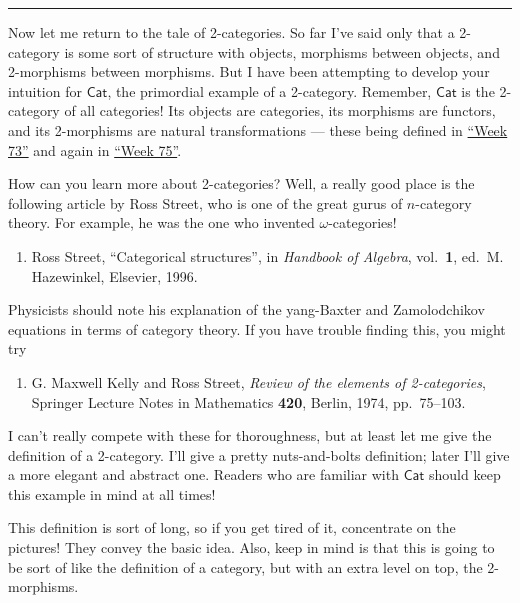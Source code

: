 \documentclass{article}
\def\tightlist{}
\begin{document}
\begin{center}\rule{0.5\linewidth}{0.5pt}\end{center}

Now let me return to the tale of 2-categories. So far I've said only
that a 2-category is some sort of structure with objects, morphisms
between objects, and 2-morphisms between morphisms. But I have been
attempting to develop your intuition for \(\mathsf{Cat}\), the
primordial example of a 2-category. Remember, \(\mathsf{Cat}\) is the
2-category of all categories! Its objects are categories, its morphisms
are functors, and its 2-morphisms are natural transformations --- these
being defined in \protect\hyperlink{week73}{``Week 73''} and again in
\protect\hyperlink{week75}{``Week 75''}.

How can you learn more about 2-categories? Well, a really good place is
the following article by Ross Street, who is one of the great gurus of
\(n\)-category theory. For example, he was the one who invented
\(\omega\)-categories!

\begin{enumerate}
\def\labelenumi{\arabic{enumi})}
\setcounter{enumi}{7}
\tightlist
\item
  Ross Street, ``Categorical structures'', in \emph{Handbook of
  Algebra}, vol.~\textbf{1}, ed.~M. Hazewinkel, Elsevier, 1996.
\end{enumerate}

Physicists should note his explanation of the yang-Baxter and
Zamolodchikov equations in terms of category theory. If you have trouble
finding this, you might try

\begin{enumerate}
\def\labelenumi{\arabic{enumi})}
\setcounter{enumi}{8}
\tightlist
\item
  G. Maxwell Kelly and Ross Street, \emph{Review of the elements of
  2-categories}, Springer Lecture Notes in Mathematics \textbf{420},
  Berlin, 1974, pp.~75--103.
\end{enumerate}

I can't really compete with these for thoroughness, but at least let me
give the definition of a 2-category. I'll give a pretty nuts-and-bolts
definition; later I'll give a more elegant and abstract one. Readers who
are familiar with \(\mathsf{Cat}\) should keep this example in mind at
all times!

This definition is sort of long, so if you get tired of it, concentrate
on the pictures! They convey the basic idea. Also, keep in mind is that
this is going to be sort of like the definition of a category, but with
an extra level on top, the 2-morphisms.
\end{document}
